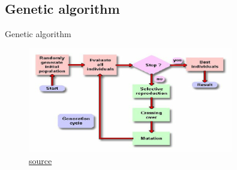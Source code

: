\documentclass[xcolor=x11names,compress]{beamer}
\renewcommand{\(}{\begin{columns}}
\renewcommand{\)}{\end{columns}}
\newcommand{\<}[1]{\begin{column}{#1}}
\renewcommand{\>}{\end{column}}
\begin{document}
\subsection{Genetic algorithm}
\begin{frame}{Genetic algorithm}

	\begin{figure} 
	
	\includegraphics[width=0.8\textwidth]{ga_process.png}  
	\caption{\href{https://www.researchgate.net/publication/4369958_Implementing_Smart_Antenna_System_using_Genetic_Algorithm_and_Artificial_Immune_System}{source}}

	\end{figure}
\end{frame}
\end{document}
